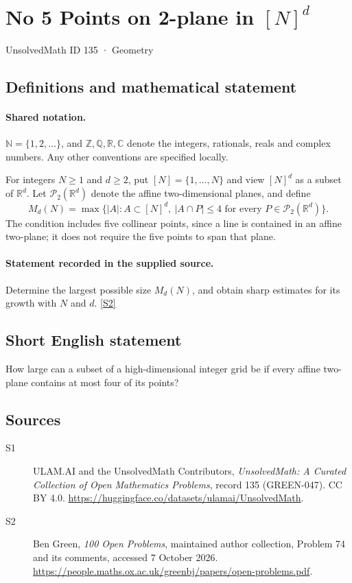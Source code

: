 \documentclass[11pt]{article}
\newcommand{\sref}[2]{\hyperlink{source:#1:#2}{[S#2]}}
\begin{document}
\setcounter{section}{134}
\section{No 5 Points on 2-plane in $[N]^d$}\label{135}
{\small\sffamily UnsolvedMath ID 135 · Geometry}
\subsection{Definitions and mathematical statement}

\paragraph{Shared notation.}$\mathbb N=\{1,2,\ldots\}$, and $\mathbb Z,\mathbb Q,\mathbb R,\mathbb C$ denote the integers, rationals, reals and complex numbers. Any other conventions are specified locally.


For integers $N\geq1$ and $d\geq2$, put $[N]=\{1,\ldots,N\}$ and view $[N]^d$ as a subset of $\mathbb R^d$. Let $\mathcal P_2(\mathbb R^d)$ denote the affine two-dimensional planes, and define
\[
 M_d(N)=\max\bigl\{|A|:A\subset[N]^d,\ |A\cap P|\leq4\text{ for every }P\in\mathcal P_2(\mathbb R^d)\bigr\}.
\]
The condition includes five collinear points, since a line is contained in an affine two-plane; it does not require the five points to span that plane.
\paragraph{Statement recorded in the supplied source.}
Determine the largest possible size $M_d(N)$, and obtain sharp estimates for its growth with $N$ and $d$. \sref{135}{2}
\subsection{Short English statement}
How large can a subset of a high-dimensional integer grid be if every affine two-plane contains at most four of its points?
\subsection{Sources}
\begin{description}
\item[\hypertarget{source:135:1}{S1}] ULAM.AI and the UnsolvedMath Contributors, \emph{UnsolvedMath: A Curated Collection of Open Mathematics Problems}, record 135 (GREEN-047). CC BY 4.0. \url{https://huggingface.co/datasets/ulamai/UnsolvedMath}.
\item[\hypertarget{source:135:2}{S2}] Ben Green, \emph{100 Open Problems}, maintained author collection, Problem 74 and its comments, accessed 7 October 2026. \url{https://people.maths.ox.ac.uk/greenbj/papers/open-problems.pdf}.
\end{description}
\label{end:135}
\end{document}
